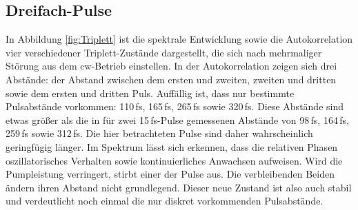 \documentclass[bachelor,       %
               twoside,        %
               BCOR10mm,       %
               liststotoc,nomtotoc,bibtotoc, %
               english,ngerman, %
               final,          %
               ]{GAUBM}
\begin{document}
\subsection{Dreifach-Pulse}
In Abbildung \ref{fig:Triplett} ist die spektrale Entwicklung sowie die Autokorrelation vier verschiedener Triplett-Zustände dargestellt, die sich nach mehrmaliger Störung aus dem cw-Betrieb einstellen.
In der Autokorrelation zeigen sich drei Abstände: der Abstand zwischen dem ersten und zweiten, zweiten und dritten sowie dem ersten und dritten Puls.
Auffällig ist, dass nur bestimmte Pulsabstände vorkommen: 110\,fs, 165\,fs, 265\,fs sowie 320\,fs.
Diese Abstände sind etwas größer als die in \cite{kitano_stable_1998} für zwei 15\,fs-Pulse gemessenen Abstände von 98\,fs, 164\,fs, 259\,fs sowie 312\,fs.
Die hier betrachteten Pulse sind daher wahrscheinlich geringfügig länger.
Im Spektrum lässt sich erkennen, dass die relativen Phasen oszillatorisches Verhalten sowie kontinuierliches Anwachsen aufweisen.
Wird die Pumpleistung verringert, stirbt einer der Pulse aus.
Die verbleibenden Beiden ändern ihren Abstand nicht grundlegend.
Dieser neue Zustand ist also auch stabil und verdeutlicht noch einmal die nur diskret vorkommenden Pulsabstände.
\end{document}
